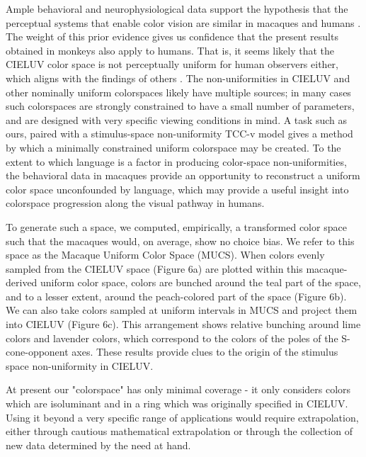 \documentclass[9pt,biorxiv,lineno,onehalfspacing]{lapreprint}
\begin{document}
\begin{refsection}
Ample behavioral and neurophysiological data support the hypothesis that the perceptual systems that enable color vision are similar in macaques and humans \citep{schnapf_spectral_1987,gagin_color-detection_2014,horwitz_what_2015,lafer-sousa_color-biased_2016}. 
The weight of this prior evidence gives us confidence that the present results obtained in monkeys also apply to humans. 
That is, it seems likely that the CIELUV color space is not perceptually uniform for human observers either, which aligns with the findings of others \citep{stockman_colorimetry_2010,judd_ideal_1970,bujack_non-riemannian_2022}. 
The non-uniformities in CIELUV and other nominally uniform colorspaces likely have multiple sources; in many cases such colorspaces are strongly constrained to have a small number of parameters, and are designed with very specific viewing conditions in mind.
A task such as ours, paired with a stimulus-space non-uniformity TCC-v model gives a method by which a minimally constrained uniform colorspace may be created.
To the extent to which language is a factor in producing color-space non-uniformities, the behavioral data in macaques provide an opportunity to reconstruct a uniform color space unconfounded by language, which may provide a useful insight into colorspace progression along the visual pathway in humans. 

To generate such a space, we computed, empirically, a transformed color space such that the macaques would, on average, show no choice bias. 
We refer to this space as the Macaque Uniform Color Space (MUCS). 
When colors evenly sampled from the CIELUV space (Figure 6a) are plotted within this macaque-derived uniform color space, colors are bunched around the teal part of the space, and to a lesser extent, around the peach-colored part of the space (Figure 6b). We can also take colors sampled at uniform intervals in MUCS and project them into CIELUV (Figure 6c). 
This arrangement shows relative bunching around lime colors and lavender colors, which correspond to the colors of the poles of the S-cone-opponent axes. 
These results provide clues to the origin of the stimulus space non-uniformity in CIELUV.

At present our "colorspace" has only minimal coverage - it only considers colors which are isoluminant and in a ring which was originally specified in CIELUV.
Using it beyond a very specific range of applications would require extrapolation, either through cautious mathematical extrapolation or through the collection of new data determined by the need at hand.


\end{refsection}
\end{document}
